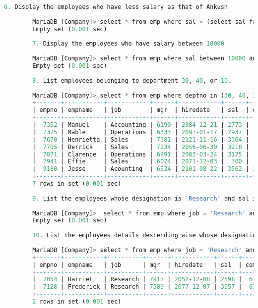 \documentclass{article}
\begin{document}
\begin{lstlisting}[language=SQL]
		6. Display the employees who have less salary as that of Ankush 
		
		MariaDB [Company]> select * from emp where sal < (select sal from emp where empname = 'Ankush'); 
		Empty set (0.001 sec) 
		
		7. Display the employees who have salary between 10000 
		
		MariaDB [Company]> select * from emp where sal between 10000 and 20000; 
		Empty set (0.001 sec) 
		
		8. List employees belonging to department 30, 40, or 10. 
		
		MariaDB [Company]> select * from emp where deptno in (30, 40, 10); 
		+-------+-----------+------------+------+------------+------+------+--------+ 
		| empno | empname   | job        | mgr  | hiredate   | sal  | comm | deptno | 
		+-------+-----------+------------+------+------------+------+------+--------+ 
		|  7352 | Manuel    | Accounting | 6190 | 2084-12-21 | 2773 |  253 |     10 | 
		|  7375 | Mable     | Operations | 6333 | 2097-01-17 | 2937 |  210 |     40 | 
		|  7670 | Henrietta | Sales      | 7381 | 2121-11-16 | 3364 |  217 |     30 | 
		|  7705 | Derrick   | Sales      | 7234 | 2056-06-30 | 3218 |  208 |     30 | 
		|  7871 | Clarence  | Operations | 6991 | 2083-03-24 | 3175 |  228 |     40 | 
		|  7941 | Effie     | Sales      | 6074 | 2071-12-03 |  700 |  265 |     30 | 
		|  9180 | Jesse     | Acounting  | 6534 | 2101-08-22 | 3562 | 1420 |     10 | 
		+-------+-----------+------------+------+------------+------+------+--------+ 
		7 rows in set (0.001 sec) 
		
		9. List the employees whose designation is 'Research' and sal is > 5000. 
		
		MariaDB [Company]>  select * from emp where job = 'Research' and sal > 5000; 
		Empty set (0.001 sec) 
		
		10. List the employees details descending wise whose designation is 'Research' and commission is > 500. 
		
		MariaDB [Company]> select * from emp where job = 'Research' and comm > 500 order by comm desc; 
		+-------+-----------+----------+------+------------+------+------+--------+ 
		| empno | empname   | job      | mgr  | hiredate   | sal  | comm | deptno | 
		+-------+-----------+----------+------+------------+------+------+--------+ 
		|  7054 | Harriet   | Research | 7917 | 2052-12-08 | 2598 |  610 |     20 | 
		|  7128 | Frederick | Research | 7589 | 2077-12-07 | 3957 |  610 |     20 | 
		+-------+-----------+----------+------+------------+------+------+--------+ 
		2 rows in set (0.001 sec) 
		
	\end{lstlisting} 
	
\end{document}
